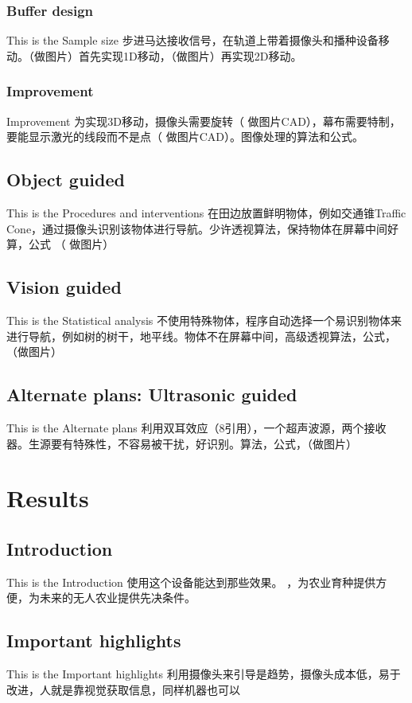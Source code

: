 \documentclass[12pt]{article}
\begin{document}
\begin{flushleft}
\subsubsection{Buffer design}
This is the Sample size
步进马达接收信号，在轨道上带着摄像头和播种设备移动。（做图片）首先实现1D移动，（做图片）再实现2D移动。

\subsubsection{Improvement}
Improvement
为实现3D移动，摄像头需要旋转（ 做图片CAD），幕布需要特制，要能显示激光的线段而不是点（ 做图片CAD）。图像处理的算法和公式。

\subsection{Object guided}
This is the Procedures and interventions 
在田边放置鲜明物体，例如交通锥Traffic Cone，通过摄像头识别该物体进行导航。少许透视算法，保持物体在屏幕中间好算，公式 （ 做图片）

\subsection{Vision guided}
This is the Statistical analysis
不使用特殊物体，程序自动选择一个易识别物体来进行导航，例如树的树干，地平线。物体不在屏幕中间，高级透视算法，公式，（做图片）

\subsection{Alternate plans: Ultrasonic guided}
This is the Alternate plans
利用双耳效应（8引用），一个超声波源，两个接收器。生源要有特殊性，不容易被干扰，好识别。算法，公式，（做图片）

\section{Results}

\subsection{Introduction}
This is the Introduction
使用这个设备能达到那些效果。
，为农业育种提供方便，为未来的无人农业提供先决条件。

\subsection{Important highlights}
This is the Important highlights
利用摄像头来引导是趋势，摄像头成本低，易于改进，人就是靠视觉获取信息，同样机器也可以


\end{flushleft}
\end{document}
